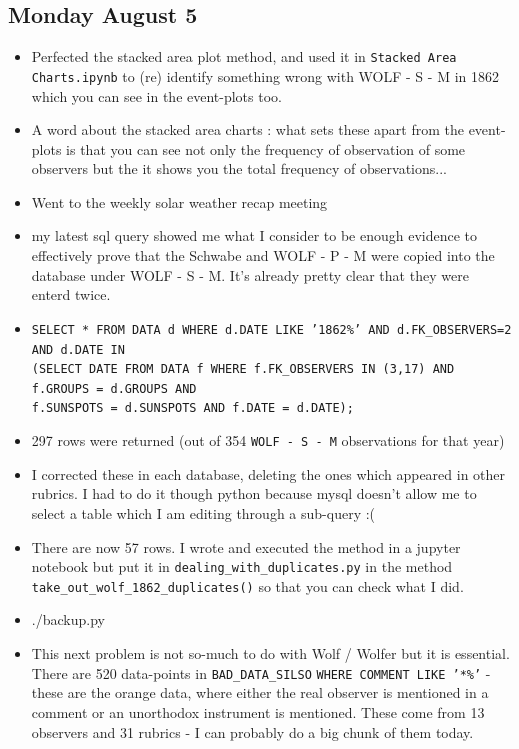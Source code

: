 \documentclass[12pt]{article}
\begin{document}
\subsection{Monday August 5}
\begin{itemize}
    \item Perfected the stacked area plot method, and used it in \texttt{Stacked Area Charts.ipynb} to (re) identify something wrong with WOLF - S - M in 1862 which you can see in the event-plots too.
    \item A word about the stacked area charts : what sets these apart from the event-plots is that you can see not only the frequency of observation of some observers but the it shows you the total frequency of observations...
    \item Went to the weekly solar weather recap meeting
    \item my latest sql query showed me what I consider to be enough evidence to effectively prove that the Schwabe and WOLF - P - M were copied into the database under WOLF - S - M. It's already pretty clear that they were enterd twice. 
    \item \texttt{SELECT * FROM DATA d WHERE d.DATE LIKE '1862\%' AND d.FK\_OBSERVERS=2 AND d.DATE IN \\(SELECT DATE FROM DATA f WHERE f.FK\_OBSERVERS IN (3,17) AND f.GROUPS = d.GROUPS AND \\f.SUNSPOTS = d.SUNSPOTS AND f.DATE = d.DATE);}
    \item 297 rows were returned (out of 354 \texttt{WOLF - S - M} observations for that year)
    \item I corrected these in each database, deleting the ones which appeared in other rubrics. I had to do it though python because mysql doesn't allow me to select a table which I am editing through a sub-query :(
    \item There are now 57 rows. I wrote and executed the method in a jupyter notebook but put it in \texttt{dealing\_with\_duplicates.py} in the method \texttt{take\_out\_wolf\_1862\_duplicates()} so that you can check what I did.
    \item ./backup.py
    \item This next problem is not so-much to do with Wolf / Wolfer but it is essential. There are 520 data-points in \texttt{BAD\_DATA\_SILSO} \texttt{WHERE COMMENT LIKE '*\%'} - these are the orange data, where either the real observer is mentioned in a comment or an unorthodox instrument is mentioned. These come from 13 observers and 31 rubrics - I can probably do a big chunk of them today.

\end{itemize}
\end{document}
